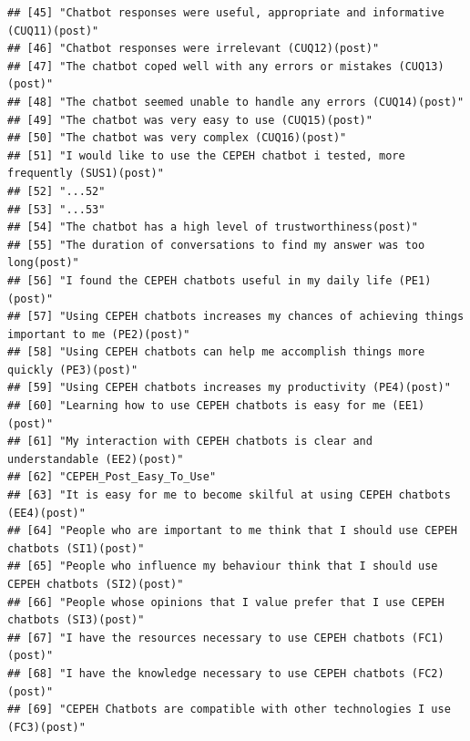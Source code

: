 \documentclass[a4paper, nobind]{templates/ociamthesis}
\begin{document}
\begin{verbatim}
## [45] "Chatbot responses were useful, appropriate and informative (CUQ11)(post)"                       
## [46] "Chatbot responses were irrelevant (CUQ12)(post)"                                                
## [47] "The chatbot coped well with any errors or mistakes (CUQ13)(post)"                               
## [48] "The chatbot seemed unable to handle any errors (CUQ14)(post)"                                   
## [49] "The chatbot was very easy to use (CUQ15)(post)"                                                 
## [50] "The chatbot was very complex (CUQ16)(post)"                                                     
## [51] "I would like to use the CEPEH chatbot i tested, more frequently (SUS1)(post)"                   
## [52] "...52"                                                                                          
## [53] "...53"                                                                                          
## [54] "The chatbot has a high level of trustworthiness(post)"                                          
## [55] "The duration of conversations to find my answer was too long(post)"                             
## [56] "I found the CEPEH chatbots useful in my daily life (PE1)(post)"                                 
## [57] "Using CEPEH chatbots increases my chances of achieving things important to me (PE2)(post)"      
## [58] "Using CEPEH chatbots can help me accomplish things more quickly (PE3)(post)"                    
## [59] "Using CEPEH chatbots increases my productivity (PE4)(post)"                                     
## [60] "Learning how to use CEPEH chatbots is easy for me (EE1)(post)"                                  
## [61] "My interaction with CEPEH chatbots is clear and understandable (EE2)(post)"                     
## [62] "CEPEH_Post_Easy_To_Use"                                                                         
## [63] "It is easy for me to become skilful at using CEPEH chatbots (EE4)(post)"                        
## [64] "People who are important to me think that I should use CEPEH chatbots (SI1)(post)"              
## [65] "People who influence my behaviour think that I should use CEPEH chatbots (SI2)(post)"           
## [66] "People whose opinions that I value prefer that I use CEPEH chatbots (SI3)(post)"                
## [67] "I have the resources necessary to use CEPEH chatbots (FC1)(post)"                               
## [68] "I have the knowledge necessary to use CEPEH chatbots (FC2)(post)"                               
## [69] "CEPEH Chatbots are compatible with other technologies I use (FC3)(post)"                        

\end{verbatim}
\end{document}
